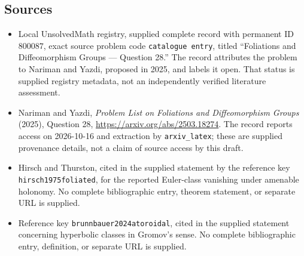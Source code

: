 \documentclass[11pt]{article}
\begin{document}
\subsection{Sources}
\begin{itemize}
\item Local UnsolvedMath registry, supplied complete record with permanent ID \(800087\), exact source problem code \texttt{catalogue entry}, titled ``Foliations and Diffeomorphism Groups --- Question 28.'' The record attributes the problem to Nariman and Yazdi, proposed in 2025, and labels it open. That status is supplied registry metadata, not an independently verified literature assessment.
\item Nariman and Yazdi, \emph{Problem List on Foliations and Diffeomorphism Groups} (2025), Question 28, \url{https://arxiv.org/abs/2503.18274}. The record reports access on 2026-10-16 and extraction by \texttt{arxiv\_latex}; these are supplied provenance details, not a claim of source access by this draft.
\item Hirsch and Thurston, cited in the supplied statement by the reference key \texttt{hirsch1975foliated}, for the reported Euler-class vanishing under amenable holonomy. No complete bibliographic entry, theorem statement, or separate URL is supplied.
\item Reference key \texttt{brunnbauer2024atoroidal}, cited in the supplied statement concerning hyperbolic classes in Gromov's sense. No complete bibliographic entry, definition, or separate URL is supplied.
\end{itemize}
\end{document}
